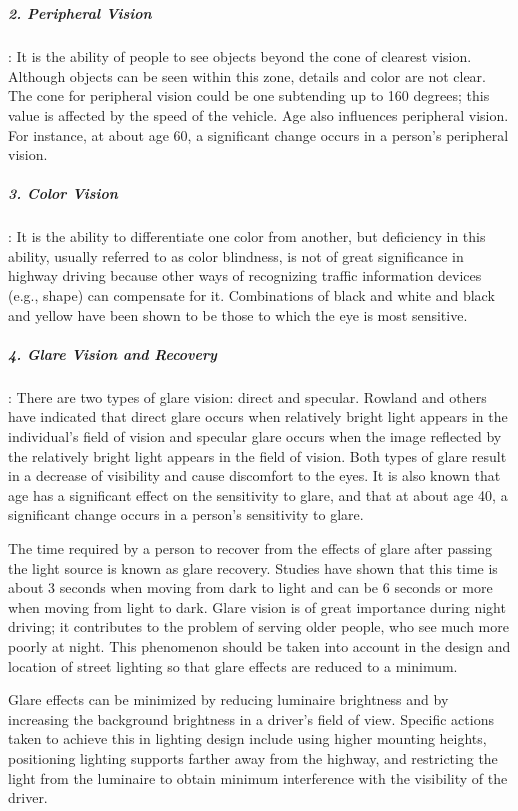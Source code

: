 \\
\subparagraph{2. Peripheral Vision}: It is the ability of people to see objects beyond the cone of clearest vision. Although objects can be seen within this zone, details and color are not clear. The cone for peripheral vision could be one subtending up to 160 degrees; this value is affected by the speed of the vehicle. Age also influences peripheral vision. For instance, at about age 60, a significant change occurs in a person’s peripheral vision.
\\
\subparagraph{3. Color Vision}: It is the ability to differentiate one color from another, but deficiency in this ability, usually referred to as color blindness, is not of great significance in highway driving because other ways of recognizing traffic information devices (e.g., shape) can compensate for it. Combinations of black and white and black and yellow have been shown to be those to which the eye is most sensitive.
\\
\subparagraph{4. Glare Vision and Recovery}: There are two types of glare vision: direct and specular. Rowland and others have indicated that direct glare occurs when relatively bright light appears in the individual’s field of vision and specular glare occurs when the image reflected by the relatively bright light appears in the field of vision. Both types of glare result in a decrease of visibility and cause discomfort to the eyes. It is also known that age has a significant effect on the sensitivity to glare, and that at about age 40, a significant change occurs in a person’s sensitivity to glare.\par
The time required by a person to recover from the effects of glare after passing the light source is known as glare recovery. Studies have shown that this time is about 3 seconds when moving from dark to light and can be 6 seconds or more when moving from light to dark. Glare vision is of great importance during night driving; it contributes to the problem of serving older people, who see much more poorly at night. This phenomenon should be taken into account in the design and location of street lighting so that glare effects are reduced to a minimum.\par
Glare effects can be minimized by reducing luminaire brightness and by increasing the background brightness in a driver’s field of view. Specific actions taken to achieve this in lighting design include using higher mounting heights, positioning lighting supports farther away from the highway, and restricting the light from the luminaire to obtain minimum interference with the visibility of the driver.
